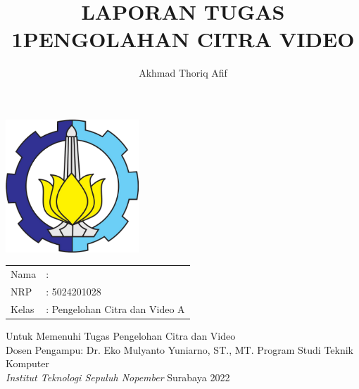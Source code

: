 \documentclass[12pt,a4paper,oneside]{article}
\title{\large{\textbf{LAPORAN TUGAS 1}\linebreak \textbf{PENGOLAHAN CITRA VIDEO}\linebreak}}
\date{}
\begin{document}
\begin{titlepage}
\maketitle
\begin{center}
\includegraphics[width=5cm,height=5cm]{images/logo-its.png}
\end{center}
\begin{center}
\end{center}
\vspace{0.5 cm}
\begin{center}
\begin{tabular}{l l}
Nama & : \author{Akhmad Thoriq Afif}\\
NRP & : 5024201028\\
Kelas & : Pengelohan Citra dan Video A\\
\end{tabular}
\end{center}
\vspace{0.5 cm}
\begin{center}
Untuk Memenuhi Tugas Pengelohan Citra dan Video \\
Dosen Pengampu: Dr. Eko Mulyanto Yuniarno, ST., MT. \linebreak
\mbox{}
\vfill
Program Studi Teknik Komputer \\
\textit {Institut Teknologi Sepuluh Nopember}
\linebreak
Surabaya 2022 \linebreak
\end{center}
\end{titlepage}
\end{document}
